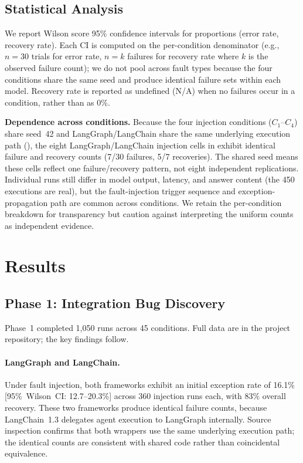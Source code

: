 \documentclass[make,article,submit,moreauthors,pdftex]{mdpi}
\begin{document}
\subsection{Statistical Analysis}

We report Wilson score 95\% confidence intervals for proportions (error rate, recovery rate). Each CI is computed on the per-condition denominator (e.g., $n = 30$ trials for error rate, $n = k$ failures for recovery rate where $k$ is the observed failure count); we do not pool across fault types because the four conditions share the same seed and produce identical failure sets within each model. Recovery rate is reported as undefined (N/A) when no failures occur in a condition, rather than as 0\%.

{\color{orange}\textbf{Dependence across conditions.} Because the four injection conditions ($C_1$--$C_4$) share seed~42 and LangGraph/LangChain share the same underlying execution path (), the eight LangGraph/LangChain injection cells in  exhibit identical failure and recovery counts (7/30 failures, 5/7 recoveries). The shared seed means these cells reflect one failure/recovery pattern, not eight independent replications. Individual runs still differ in model output, latency, and answer content (the 450 executions are real), but the fault-injection trigger sequence and exception-propagation path are common across conditions. We retain the per-condition breakdown for transparency but caution against interpreting the uniform counts as independent evidence.}


\section{Results}\label{sec:results}

\subsection{Phase 1: Integration Bug Discovery}\label{sec:phase1-results}

Phase~1 completed 1{,}050 runs across 45 conditions. Full data are in the project repository; the key findings follow.

\paragraph{LangGraph and LangChain.} Under fault injection, both frameworks exhibit an initial exception rate of 16.1\% [95\%~Wilson~CI: 12.7--20.3\%] across 360 injection runs each, with 83\% overall recovery. These two frameworks produce identical failure counts, because LangChain~1.3 delegates agent execution to LangGraph internally. Source inspection confirms that both wrappers use the same underlying execution path; the identical counts are consistent with shared code rather than coincidental equivalence.
\end{document}
